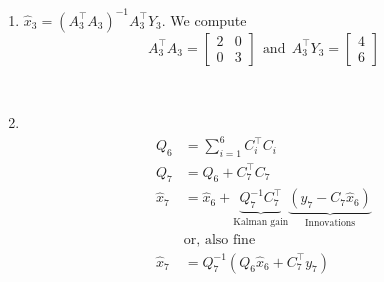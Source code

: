 \documentclass[letterpaper]{article}
\begin{document}
\begin{enumerate}
\setlength{\itemsep}{.15in}
\renewcommand{\labelenumi}{(\alph{enumi})}
\setlength{\itemsep}{.1in}
\item  $\widehat{x}_{3}= (A_3^\top A_3)^{-1}A_3^\top Y_3$. We compute
$$A_3^\top A_3 = \left[ \begin{array}{rr} 2 & 0 \\ 0& 3\end{array}  \right]~~\text{and}~~A_3^\top Y_3=\left[ \begin{array}{c} 4 \\6 \end{array} \right]$$

\\

\item
{}\\

\begin{align*} Q_6 &= \sum\limits_{i=1}^6 C_i^\top C_i \\
Q_{7} &= Q_6+C_{7}^\top C_{7} \\
\hat{x}_{7}& =\hat{x}_6+\underbrace{ Q_{7}^{-1} C_{7}^\top }_{\text{Kalman gain}} \underbrace{ (y_{7}-C_{7}\hat{x}_6)}_{\text{Innovations} } \\
&\text{or, also fine} \\
\hat{x}_{7} &=Q_{7}^{-1} \left( Q_6\hat{x}_6+C_{7}^\top y_{7} \right)\end{align*}


\end{enumerate}
\end{document}
